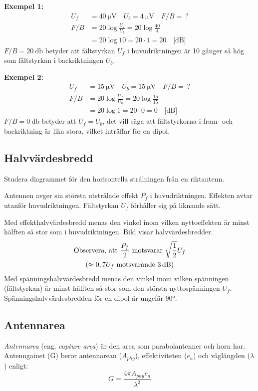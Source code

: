 \textbf{Exempel 1:}
\begin{align*}
  U_f &= \SI{40}{\micro\volt} \quad U_b = \SI{4}{\micro\volt} \quad F/B =\ ? \\
  F/B &= 20 \log\frac{U_f}{U_b} = 20 \log\frac{40}{4} \\
  &= 20 \log 10 = 20 \cdot 1 = 20 \quad \text{[dB]}
\end{align*}
\(F/B = \SI{20}{\decibel}\) betyder att fältstyrkan \(U_f\) i huvudriktningen är
10 gånger så hög som fältstyrkan i backriktningen \(U_b\).

\noindent\textbf{Exempel 2:}
\begin{align*}
  U_f &= \SI{15}{\micro\volt} \quad U_b = \SI{15}{\micro\volt} \quad F/B =\ ? \\
  F/B &= 20 \log\frac{U_f}{U_b} = 20 \log\frac{15}{15} \\
  &= 20 \log 1 = 20 \cdot 0 = 0 \quad \text{[dB]}
\end{align*}
\(F/B = \SI{0}{\decibel}\) betyder att \(U_f = U_b\), det vill säga att
fältstyrkorna i fram- och backriktning är lika stora, vilket inträffar för en
dipol.

\newpage
\subsection{Halvvärdesbredd}

Studera diagrammet för den horisontella strålningen från en riktantenn.

Antennen avger sin största utstrålade effekt \(P_f\) i huvudriktningen.
Effekten avtar utanför huvudriktningen.
Fältstyrkan \(U_f\) förhåller sig på liknande sätt.

Med effekthalvvärdesbredd menas den vinkel inom vilken nyttoeffekten
är minst hälften så stor som i huvudriktningen.
Bild  visar halvvärdesbredder.
\begin{gather*}
  \text{Observera, att } \frac{P_f}{2} \text{ motsvarar }
  \sqrt{\frac{1}{2}}U_f \\
  ( \approx 0,7 U_f \text{ motsvarande \SI{3}{\decibel}})
\end{gather*}
Med spänningshalvvärdesbredd menas den vinkel inom vilken spänningen
(fältstyrkan) är minst hälften så stor som den största nyttospänningen \(U_f\).
Spänningshalvvärdesbredden för en dipol är ungefär \ang{90}.


\subsection{Antennarea}

\emph{Antennarea} (eng. \emph{capture area}) är den area som parabolantenner
och horn har.
Antenngainet (G) beror antennarean (\(A_{phy}\)), effektiviteten (\(e_a\)) och
våglängden (\(\lambda\)) enligt:
\[ G = \frac{4\pi A_{phy}e_a}{\lambda^2} \]
